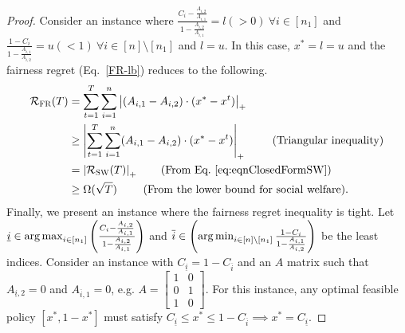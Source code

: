 \begin{proof}
    Consider an instance where $\frac{C_i-\frac{A_{i, 2}}{A_{i, 1}}}{1-\frac{A_{i, 2}}{A_{i, 1}}} = l(>0) \ \forall i\in [n_1]$ and $\frac{1-C_i}{1-\frac{A_{i, 1}}{A_{i, 2}}}=u(<1) \ \forall i\in [n]\setminus [n_1]$ and $l=u$. In this case, $x^*=l=u$ and the fairness regret (Eq.~\ref{FR-lb}) reduces to the following.
    \begin{align*}
        \mathcal{R}_\textsc{FR}(T) &= \sum_{t=1}^T\sum_{i=1}^n \left|(A_{i,1}-A_{i,2})\cdot (x^*-x^t)\right|_+ \\
        &\geq   \left|\sum_{t=1}^T\sum_{i=1}^n (A_{i,1}-A_{i,2})\cdot (x^*-x^t) \right|_+ \ \tag{Triangular inequality}\\
        &= \left| \mathcal{R}_\textsc{SW}(T) \right|_+ \tag{From Eq.~\ref{eq:eqnClosedFormSW}}\\
        &\geq   \Omega(\sqrt{T})  \ \tag{From the lower bound for social welfare}.
    \end{align*}
    Finally, we present an instance where the fairness regret inequality is tight. Let $\underline{i}\in \operatorname*{arg\,max}_{i\in [n_1]}\left(\frac{C_i-\frac{A_{i, 2}}{A_{i, 1}}}{1-\frac{A_{i, 2}}{{A_{i, 1}}}} \right)$ and $\overline{i}\in \left(\operatorname*{arg\,min}_{i\in [n]\setminus [n_1]} \frac{1 - C_i}{ 1 - \frac{A_{i,1}}{A_{i,2}}}\right)$ be the least indices. Consider an instance with $C_{\underline{i}} = 1-C_{\overline{i}}$ and an $A$ matrix such that $A_{\underline{i}, 2}=0$ and $A_{\overline{i}, 1}=0$, e.g. $A=\begin{bmatrix}
    1 & 0\\
    0 & 1\\
    1 & 0
    \end{bmatrix}$. For this instance, any optimal feasible policy $[x^*, 1-x^*]$ must satisfy $C_{\underline{i}}\leq x^* \leq 1-C_{\overline{i}} \implies x^* = C_{\underline{i}}$.

\end{proof}

